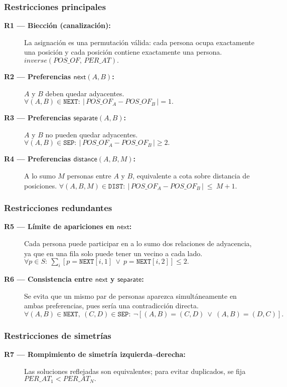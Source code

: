 \subsubsection*{Restricciones principales}
\begin{description}
  \item[\textbf{R1 — Biección (canalización):}] La asignación es una permutación válida: cada persona ocupa exactamente una posición y cada posición contiene exactamente una persona. \(\textit{inverse}(POS\_OF,\,PER\_AT).\)
  \item[\textbf{R2 — Preferencias \(\textsf{next}(A,B)\):}] \(A\) y \(B\) deben quedar adyacentes. \(\forall (A,B)\in \texttt{NEXT}:\ \big|\,POS\_OF_A - POS\_OF_B\,\big| = 1.\)
  \item[\textbf{R3 — Preferencias \(\textsf{separate}(A,B)\):}] \(A\) y \(B\) no pueden quedar adyacentes. \(\forall (A,B)\in \texttt{SEP}:\ \big|\,POS\_OF_A - POS\_OF_B\,\big| \ge 2.\)
  \item[\textbf{R4 — Preferencias \(\textsf{distance}(A,B,M)\):}] A lo sumo \(M\) personas entre \(A\) y \(B\), equivalente a cota sobre distancia de posiciones. \(\forall (A,B,M)\in \texttt{DIST}:\ \big|\,POS\_OF_A - POS\_OF_B\,\big|\ \le\ M+1.\)
\end{description}
\subsubsection*{Restricciones redundantes}
\begin{description}
  \item[\textbf{R5 — Límite de apariciones en \(\textsf{next}\):}] Cada persona puede participar en a lo sumo dos relaciones de adyacencia, ya que en una fila solo puede tener un vecino a cada lado. \(\forall p\in S:\ \sum_i [p=\texttt{NEXT}[i,1]\ \vee\ p=\texttt{NEXT}[i,2]] \le 2.\)
  \item[\textbf{R6 — Consistencia entre \(\textsf{next}\) y \(\textsf{separate}\):}] Se evita que un mismo par de personas aparezca simultáneamente en ambas preferencias, pues sería una contradicción directa. \(\forall (A,B)\in\texttt{NEXT},\ (C,D)\in\texttt{SEP}:\ \neg[(A,B)=(C,D)\ \vee\ (A,B)=(D,C)].\)
\end{description}
\subsubsection*{Restricciones de simetrías}
\begin{description}
  \item[\textbf{R7 — Rompimiento de simetría izquierda–derecha:}] Las soluciones reflejadas son equivalentes; para evitar duplicados, se fija \(PER\_AT_1<PER\_AT_N.\)
\end{description}
